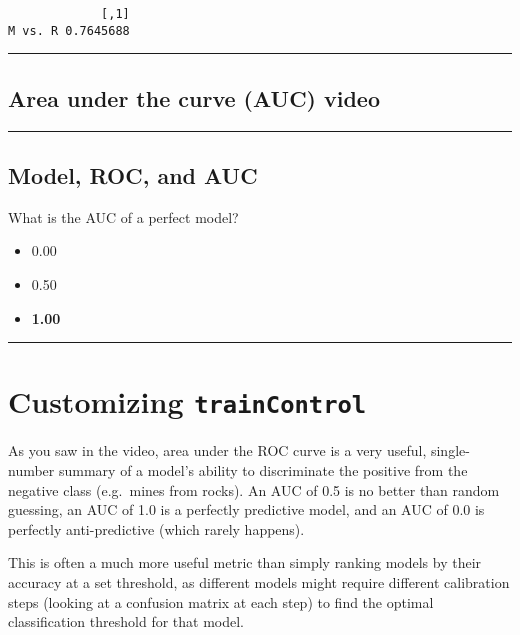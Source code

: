 \documentclass[]{book}
\begin{document}
\begin{verbatim}
             [,1]
M vs. R 0.7645688
\end{verbatim}

\begin{center}\rule{0.5\linewidth}{\linethickness}\end{center}

\subsection*{Area under the curve (AUC)
video}\label{area-under-the-curve-auc-video}

\begin{center}\rule{0.5\linewidth}{\linethickness}\end{center}

\subsection*{Model, ROC, and AUC}\label{model-roc-and-auc}

What is the AUC of a perfect model?

\begin{itemize}
\item
  0.00
\item
  0.50
\item
  \textbf{1.00}
\end{itemize}

\begin{center}\rule{0.5\linewidth}{\linethickness}\end{center}

\section{\texorpdfstring{Customizing
\texttt{trainControl}}{Customizing trainControl}}\label{customizing-traincontrol}

As you saw in the video, area under the ROC curve is a very useful,
single-number summary of a model's ability to discriminate the positive
from the negative class (e.g.~mines from rocks). An AUC of 0.5 is no
better than random guessing, an AUC of 1.0 is a perfectly predictive
model, and an AUC of 0.0 is perfectly anti-predictive (which rarely
happens).

This is often a much more useful metric than simply ranking models by
their accuracy at a set threshold, as different models might require
different calibration steps (looking at a confusion matrix at each step)
to find the optimal classification threshold for that model.
\end{document}
